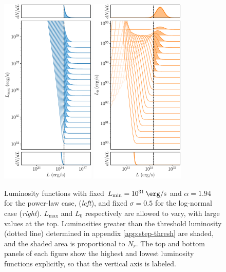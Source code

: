 \documentclass[letter,11pt]{article}
\begin{document}
\begin{figure}
  \centering
  \includegraphics[width=0.4\textwidth]{figs/slice-power-law.pdf}
  \hfill
  \includegraphics[width=0.4\textwidth]{figs/slice-log-normal.pdf}
  \caption{Luminosity functions with fixed $L_\text{min}=\SI{e31}{\erg\per\second}$ and $\alpha=1.94$ for the power-law case, (\textit{left}), and fixed $\sigma=0.5$ for the log-normal case (\textit{right}). $L_\text{max}$ and $L_0$ respectively are allowed to vary, with large values at the top. Luminosities greater than the threshold luminosity (dotted line) determined in appendix \ref{app:step-thresh} are shaded, and the shaded area is proportional to $N_r$. The top and bottom panels of each figure show the highest and lowest luminosity functions explicitly, so that the vertical axis is labeled.}
  \label{fig:lum-slices}
\end{figure}
\end{document}
